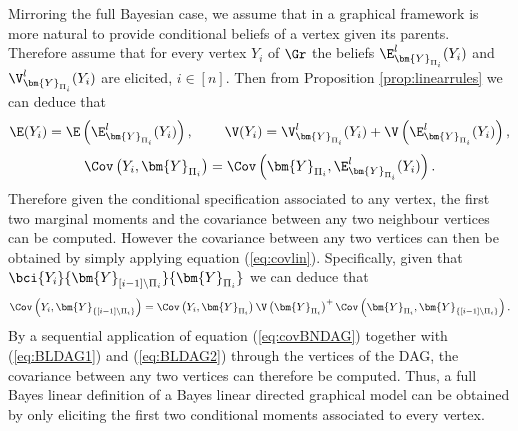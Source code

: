 Mirroring the full Bayesian case, we assume that in a graphical framework is more natural to provide conditional beliefs of a vertex given its parents. Therefore assume that for every vertex $Y_i$ of $\Gr$ the beliefs $\E_{\bm{Y}_{\Pi_i}}^l(Y_i)$ and $\V_{\bm{Y}_{\Pi_i}}^l(Y_i)$ are elicited, $i\in[n]$. Then from Proposition \ref{prop:linearrules} we can deduce that
\begin{equation}
\label{eq:BLDAG1}
\E(Y_i)=\E\left(\E_{\bm{Y}_{\Pi_i}}^l(Y_i)\right),\;\;\;\;\;\;\;\;\V(Y_i)=\V_{\bm{Y}_{\Pi_i}}^l(Y_i)+\V\left(\E_{\bm{Y}_{\Pi_i}}^l(Y_i)\right),
\end{equation}
\begin{equation}
\label{eq:BLDAG2}
\Cov\left(Y_i,\bm{Y}_{\Pi_i}\right)=\Cov\left(\bm{Y}_{\Pi_i},\E_{\bm{Y}_{\Pi_i}}^l(Y_i)\right).
\end{equation}
Therefore given the conditional specification associated to any vertex,  the first two marginal moments and the covariance between any two neighbour vertices can be computed. However the covariance between any two vertices can then be obtained by simply applying equation (\ref{eq:covlin}). Specifically, given that $\bci{Y_i}{\bm{Y}_{[i-1]\setminus \Pi_i}}{\bm{Y}_{\Pi_i}}$ we can deduce that
\begin{equation}
\label{eq:covBNDAG}
\Cov\left(Y_i,\bm{Y}_{\{[i-1]\setminus \Pi_i\}}\right)=\Cov\left(Y_i,\bm{Y}_{\Pi_i}\right)\V\left(\bm{Y}_{\Pi_i}\right)^{+}\Cov\left(\bm{Y}_{\Pi_i},\bm{Y}_{\{[i-1]\setminus \Pi_i\}}\right).
\end{equation} 
By a sequential application of equation (\ref{eq:covBNDAG}) together with (\ref{eq:BLDAG1}) and (\ref{eq:BLDAG2}) through the vertices of the \gls{DAG}, the covariance between any two vertices can therefore be computed. Thus, a full Bayes linear definition of a Bayes linear directed graphical model can be obtained by only eliciting the first two conditional moments associated to every vertex. 
